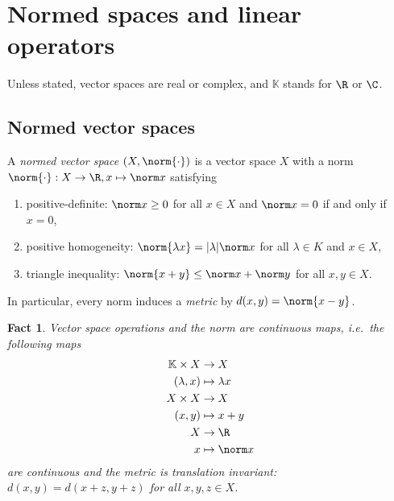 \documentclass[a4paper]{article}
\newtheorem*{fact}{Fact}
\newcommand{\K}{{\mathbb{K}}} %
\begin{document}


\tableofcontents

\section{Normed spaces and linear operators}

Unless stated, vector spaces are real or complex, and \(\K\) stands for \(\R\) or \(\C\).

\subsection{Normed vector spaces}

\begin{definition}
  A \emph{normed vector space} \((X, \norm{\cdot})\) is a vector space \(X\) with a norm \(\norm{\cdot}: X \to \R, x \mapsto \norm x\) satisfying
  \begin{enumerate}
  \item positive-definite: \(\norm x \geq 0\) for all \(x \in X\) and \(\norm x = 0\) if and only if \(x = 0\),
  \item positive homogeneity: \(\norm{\lambda x} = |\lambda| \norm x\) for all \(\lambda \in K\) and \(x \in X\),
  \item triangle inequality: \(\norm{x + y} \leq \norm x + \norm y\) for all \(x, y \in X\).
  \end{enumerate}
\end{definition}

In particular, every norm induces a \emph{metric} by \(d(x, y) = \norm{x - y}\).

\begin{fact}
Vector space operations and the norm are continuous maps, i.e.\ the following maps
\begin{align*}
  \K \times X &\to X \\
  (\lambda, x) &\mapsto \lambda x \\
  X \times X &\to X \\
  (x, y) &\mapsto x + y \\
  X &\to \R \\
  x &\mapsto \norm x
\end{align*}
are continuous and the metric is translation invariant: \(d(x, y) = d(x + z, y + z)\) for all \(x, y, z \in X\).
\end{fact}
\end{document}
